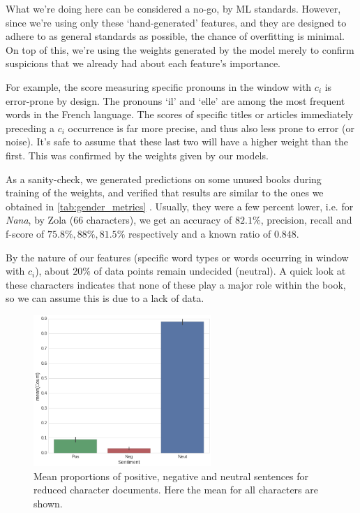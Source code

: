 What we're doing here can be considered a no-go, by ML standards. However, since we're using only these `hand-generated' features, and they are designed to adhere to as general standards as possible, the chance of overfitting is minimal. On top of this, we're using the weights generated by the model merely to confirm suspicions that we already had about each feature's importance. 

For example, the score measuring specific pronouns in the window with $c_i$ is error-prone by design. The pronouns `il' and `elle' are among the most frequent words in the French language. The scores of specific titles or articles immediately preceding a $c_i$ occurrence is far more precise, and thus also less prone to error (or noise). It's safe to assume that these last two will have a higher weight than the first. This was confirmed by the weights given by our models. 

As a sanity-check, we generated predictions on some unused books during training of the weights, and verified that results are similar to the ones we obtained in \cref{tab:gender_metrics} . Usually, they were a few percent lower, i.e. for \textit{Nana}, by Zola (66 characters), we get an accuracy of $82.1\%$, precision, recall and f-score of $75.8\%, 88\%, 81.5\%$ respectively and a known ratio of $0.848$.

By the nature of our features (specific word types or words occurring in window with $c_i$), about $20\%$ of data points remain undecided (neutral). A quick look at these characters indicates that none of these play a major role within the book, so we can assume this is due to a lack of data.

\begin{figure}
\centering
  \includegraphics[width=0.6\textwidth]{fig/sent_prop.png}
  \caption{Mean proportions of positive, negative and neutral sentences for reduced character documents. Here the mean for all characters are shown.}
  \label{fig:sent_prop}
\end{figure}

